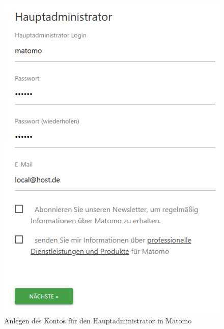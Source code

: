 \begin{figure}[H]
    \centering
    \begin{minipage}{0.49\textwidth}
        \centering
        \includegraphics[width=\linewidth, keepaspectratio]{images/haupadministrator.png}
        \caption{Anlegen des Kontos für den Hauptadministrator in Matomo}
        \label{fig:hauptadministrator}
    \end{minipage}
    \hfill
    \begin{minipage}{0.49\textwidth}
        \centering

\end{minipage}
\end{figure}
